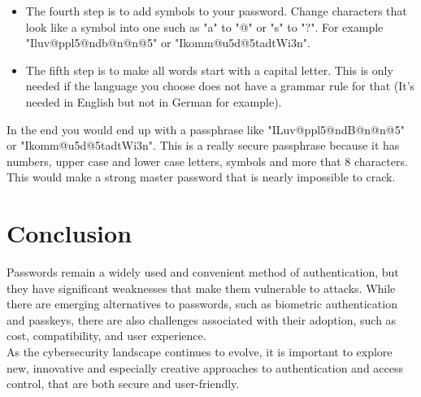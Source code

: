 \documentclass[conference]{IEEEtran}
\begin{document}
\begin{enumerate}
\begin{itemize}
\item The fourth step is to add symbols to your password. Change characters that look like a symbol into one such as "a" to "@" or "s" to "?". For example "Iluv@ppl5@ndb@n@n@5" or "Ikomm@u5d@5tadtWi3n".
\item The fifth step is to make all words start with a capital letter. This is only needed if the language you choose does not have a grammar rule for that (It's needed in English but not in German for example). 
\end{itemize}
In the end you would end up with a passphrase like "ILuv@ppl5@ndB@n@n@5" or "Ikomm@u5d@5tadtWi3n". This is a really secure passphrase because it has numbers, upper case and lower case letters, symbols and more that 8 characters. This would make a strong master password that is nearly impossible to crack.
\end{enumerate}


\section{Conclusion}
Passwords remain a widely used and convenient method of authentication, but they have significant weaknesses that make them vulnerable to attacks. While there are emerging alternatives to passwords, such as biometric authentication and passkeys, there are also challenges associated with their adoption, such as cost, compatibility, and user experience.\\
As the cybersecurity landscape continues to evolve, it is important to explore new, innovative and especially creative approaches to authentication and access control, that are both secure and user-friendly.


\listoffigures
\end{document}
